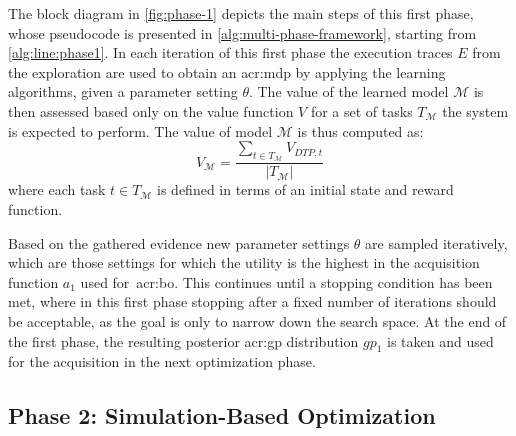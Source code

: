 The block diagram in \autoref{fig:phase-1} depicts the main steps of this first phase, whose pseudocode is presented in \autoref{alg:multi-phase-framework}, starting from \autoref{alg:line:phase1}.
In each iteration of this first phase the execution traces $E$ from the exploration are used to obtain an \acrshort{acr:mdp} by applying the learning algorithms, given a parameter setting $\theta$.
The value of the learned model $\mathcal{M}$ is then assessed based only on the value function $V$ for a set of tasks $T_\mathcal{M}$ the system is expected to perform.
The value of model $\mathcal{M}$ is thus computed as:
\begin{equation*} 
V_{\mathcal{M}} = \frac{\sum_{t \in T_\mathcal{M}} V_{\mathit{DTP}, t}}{|T_\mathcal{M}|}
\end{equation*}
where each task $t \in T_\mathcal{M}$ is defined in terms of an initial state and reward function.

Based on the gathered evidence new parameter settings $\theta$ are sampled iteratively, which are those settings for which the utility is the highest in the acquisition function $a_1$ used for~\acrshort{acr:bo}.
This continues until a stopping condition has been met, where in this first phase stopping after a fixed number of iterations should be acceptable, as the goal is only to narrow down the search space.
At the end of the first phase, the resulting posterior \acrshort{acr:gp} distribution $\mathit{gp}_1$ is taken and used for the acquisition in the next optimization phase.





\newpage

\subsection{Phase 2: Simulation-Based Optimization}
\label{sec:phase-2}


